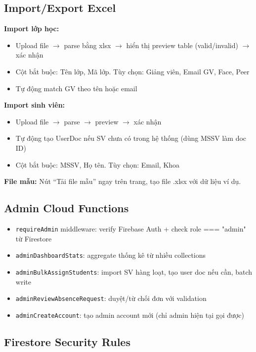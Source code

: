 \documentclass{article}
\begin{document}
\subsection{Import/Export Excel}

\textbf{Import lớp học:}
\begin{itemize}[leftmargin=1.5em]
  \item Upload file $\rightarrow$ parse bằng xlsx $\rightarrow$ hiển thị preview table (valid/invalid) $\rightarrow$ xác nhận
  \item Cột bắt buộc: Tên lớp, Mã lớp. Tùy chọn: Giảng viên, Email GV, Face, Peer
  \item Tự động match GV theo tên hoặc email
\end{itemize}

\textbf{Import sinh viên:}
\begin{itemize}[leftmargin=1.5em]
  \item Upload file $\rightarrow$ parse $\rightarrow$ preview $\rightarrow$ xác nhận
  \item Tự động tạo UserDoc nếu SV chưa có trong hệ thống (dùng MSSV làm doc ID)
  \item Cột bắt buộc: MSSV, Họ tên. Tùy chọn: Email, Khoa
\end{itemize}

\textbf{File mẫu:} Nút ``Tải file mẫu'' ngay trên trang, tạo file .xlsx với dữ liệu ví dụ.

\subsection{Admin Cloud Functions}

\begin{itemize}[leftmargin=1.5em]
  \item \texttt{requireAdmin} middleware: verify Firebase Auth + check role === "admin" từ Firestore
  \item \texttt{adminDashboardStats}: aggregate thống kê từ nhiều collections
  \item \texttt{adminBulkAssignStudents}: import SV hàng loạt, tạo user doc nếu cần, batch write
  \item \texttt{adminReviewAbsenceRequest}: duyệt/từ chối đơn với validation
  \item \texttt{adminCreateAccount}: tạo admin account mới (chỉ admin hiện tại gọi được)
\end{itemize}

\subsection{Firestore Security Rules}
\end{document}
